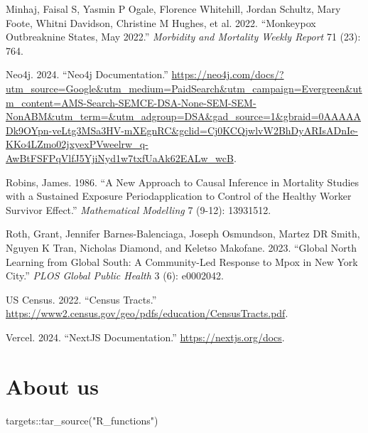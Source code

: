 \documentclass[
  letterpaper,
  DIV=11,
  numbers=noendperiod,
  oneside]{scrreprt}
\newenvironment{Shaded}{\begin{snugshade}}{\end{snugshade}}
\newcommand{\FunctionTok}[1]{\textcolor[rgb]{0.28,0.35,0.67}{#1}}
\newcommand{\NormalTok}[1]{\textcolor[rgb]{0.00,0.23,0.31}{#1}}
\newcommand{\SpecialCharTok}[1]{\textcolor[rgb]{0.37,0.37,0.37}{#1}}
\newcommand{\StringTok}[1]{\textcolor[rgb]{0.13,0.47,0.30}{#1}}
\newlength{\cslhangindent}
\newlength{\cslentryspacingunit} %
\newenvironment{CSLReferences}[2] %
 {%
  \setlength{\parindent}{0pt}
  \ifodd #1
  \let\oldpar\par
  \def\par{\hangindent=\cslhangindent\oldpar}
  \fi
  \setlength{\parskip}{#2\cslentryspacingunit}
 }%
 {}
\begin{document}
\begin{CSLReferences}{1}{0}
\leavevmode{}%
Minhaj, Faisal S, Yasmin P Ogale, Florence Whitehill, Jordan Schultz,
Mary Foote, Whitni Davidson, Christine M Hughes, et al. 2022.
{``Monkeypox Outbreak{\textemdash}nine States, May 2022.''}
\emph{Morbidity and Mortality Weekly Report} 71 (23): 764.

\leavevmode{}%
Neo4j. 2024. {``Neo4j Documentation.''}
\url{https://neo4j.com/docs/?utm_source=Google\&utm_medium=PaidSearch\&utm_campaign=Evergreen\&utm_content=AMS-Search-SEMCE-DSA-None-SEM-SEM-NonABM\&utm_term=\&utm_adgroup=DSA\&gad_source=1\&gbraid=0AAAAADk9OYpn-veLtg3MSa3HV-mXEgnRC\&gclid=Cj0KCQjwlvW2BhDyARIsADnIe-KKo4LZmo02jxyexPVweelrw_q-AwBtFSFPqVlfJ5YjiNyd1w7txfUaAk62EALw_wcB}.

\leavevmode{}%
Robins, James. 1986. {``A New Approach to Causal Inference in Mortality
Studies with a Sustained Exposure Period{\textemdash}application to
Control of the Healthy Worker Survivor Effect.''} \emph{Mathematical
Modelling} 7 (9-12): 13931512.

\leavevmode{}%
Roth, Grant, Jennifer Barnes-Balenciaga, Joseph Osmundson, Martez DR
Smith, Nguyen K Tran, Nicholas Diamond, and Keletso Makofane. 2023.
{``Global North Learning from Global South: A Community-Led Response to
Mpox in New York City.''} \emph{PLOS Global Public Health} 3 (6):
e0002042.

\leavevmode{}%
US Census. 2022. {``Census Tracts.''}
\url{https://www2.census.gov/geo/pdfs/education/CensusTracts.pdf}.

\leavevmode{}%
Vercel. 2024. {``NextJS Documentation.''} \url{https://nextjs.org/docs}.

\end{CSLReferences}

\hypertarget{about-us}{%
\chapter{About us}\label{about-us}}

\begin{Shaded}
\begin{Highlighting}[]
\NormalTok{targets}\SpecialCharTok{::}\FunctionTok{tar\_source}\NormalTok{(}\StringTok{"R\_functions"}\NormalTok{)}
\end{Highlighting}
\end{Shaded}
\end{document}
